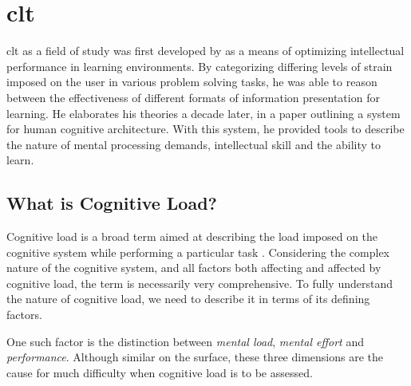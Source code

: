 \section{\acrlong{clt}} \label{sec:bt/CLT}

\acrfull{clt} as a field of study was first developed by \textcite{sweller1988} as a means of optimizing intellectual performance in learning environments. By categorizing differing levels of strain imposed on the user in various problem solving tasks, he was able to reason between the effectiveness of different formats of information presentation for learning. He elaborates his theories a decade later, in a paper outlining a system for human cognitive architecture. With this system, he provided tools to describe the nature of mental processing demands, intellectual skill and the ability to learn.



\subsection{What is Cognitive Load?}


Cognitive load is a broad term aimed at describing the load imposed on the cognitive system while performing a particular task \cite{paas1994A}. Considering the complex nature of the cognitive system, and all factors both affecting and affected by cognitive load, the term is necessarily very comprehensive. To fully understand the nature of cognitive load, we need to describe it in terms of its defining factors. 

One such factor is the distinction between \textit{mental load}, \textit{mental effort} and \textit{performance}. Although similar on the surface, these three dimensions are the cause for much difficulty when cognitive load is to be assessed.

